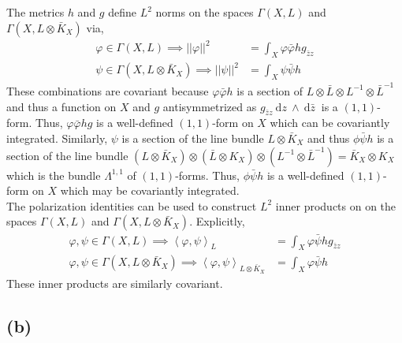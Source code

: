 \documentclass[12pt]{extarticle}
\newcommand{\inner}[2]{\left< #1, #2 \right>}
\renewcommand{\d}[1]{\: \mathrm{d}#1 \:}
\theoremstyle{definition}
\begin{document}
The metrics $h$ and $g$ define $L^2$ norms on the spaces $\Gamma(X, L)$ and $\Gamma(X, L \otimes \bar{K}_X)$ via,
\begin{align*}
\varphi \in \Gamma(X, L) \implies ||\varphi||^2 & = \int_X \varphi \bar{\varphi} h g_{\bar{z} z} 
\\
\psi \in \Gamma(X, L \otimes \bar{K}_X) \implies ||\psi||^2 & = \int_X \psi \bar{\psi} h 
\end{align*}
These combinations are covariant because $\varphi \bar{\varphi} h$ is a section of $L \otimes \bar{L} \otimes L^{-1} \otimes \bar{L}^{-1}$ and thus a function on $X$ and $g$ antisymmetrized as $g_{\bar{z} z} \d{z} \wedge \d{\bar{z}}$ is a $(1,1)$-form. Thus, $\varphi \bar{\varphi} h g$ is a well-defined $(1,1)$-form on $X$ which can be covariantly integrated. Similarly, $\psi$ is a section of the line bundle $L \otimes \bar{K}_X$ and thus $\phi \bar{\psi} h$ is a section of the line bundle $(L \otimes \bar{K}_X) \otimes (\bar{L} \otimes K_X) \otimes (L^{-1} \otimes \bar{L}^{-1}) = \bar{K}_X \otimes K_X$ which is the bundle $\Lambda^{1,1}$ of $(1,1)$-forms. Thus, $\phi \bar{\psi} h$ is a well-defined $(1,1)$-form on $X$ which may be covariantly integrated. 
\bigskip\\
The polarization identities can be used to construct $L^2$ inner products on on the spaces $\Gamma(X, L)$ and $\Gamma(X, L \otimes \bar{K}_X)$. Explicitly,
\begin{align*}
\varphi, \psi \in \Gamma(X, L) \implies \inner{\varphi}{\psi}_{L} & = \int_X \varphi \bar{\psi} h g_{\bar{z} z}
\\
\varphi, \psi \in \Gamma(X, L \otimes \bar{K}_X) \implies \inner{\varphi}{\psi}_{L \otimes \bar{K}_X} & = \int_X \varphi \bar{\psi} h
\end{align*}
These inner products are similarly covariant.
\subsection*{(b)}
\end{document}
